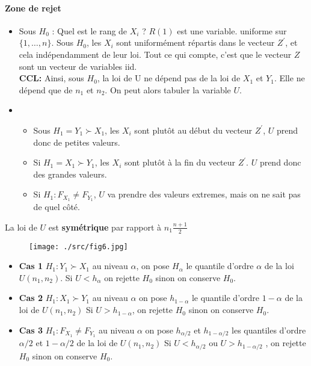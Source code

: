 \documentclass{article}
\theoremstyle{plain}%
\theoremstyle{definition}
\theoremstyle{remark}
\begin{document}
\paragraph*{Zone de rejet}
\begin{itemize}
    \item Sous $ H_0 $ : Quel est le rang de $ X_i $ ? $ R(1) $ est une variable. uniforme sur $ \{1,\dots,n\} $. Sous $ H_0 $, les $ X_i $ sont uniformément répartis dans le vecteur $ Z^\prime  $, et cela indépendamment de leur loi. Tout ce qui compte, c'est que le vecteur $ Z $ sont un vecteur de variables iid. \\
    \textbf{CCL:} Ainsi, sous $ H_0 $, la loi de U ne dépend pas de la loi de $ X_1 $ et $ Y_1 $. Elle ne dépend que de $ n_1 $ et $ n_2 $. On peut alors tabuler la variable $ U $.
    \item \begin{itemize}
        \item Sous $ H_1 = Y_1 \succ X_1$, les $ X_i $ sont plutôt au début du vecteur $ Z^\prime $, $ U $ prend donc de petites valeurs.
        \item Si $ H_1 = X_1 \succ Y_1 $, les $ X_i $ sont plutôt à la fin du vecteur $ Z^\prime  $. $ U $  prend donc des grandes valeurs.
        \item Si $ H_1 : F_{X_1} \neq F_{Y_1} $, $ U $ va prendre des valeurs extremes, mais on ne sait pas de quel côté.
    \end{itemize}
\end{itemize}

La loi de $ U $ est \textbf{symétrique} par rapport à $ n_1 \frac{n+1}{2} $ 
\begin{figure}[!h]
    \centering
    \texttt{[image: ./src/fig6.jpg]}
\end{figure}

\begin{itemize}
    \item \textbf{Cas 1} $ H_1: Y_1 \succ X_1 $ au niveau $ \alpha $, on pose $ H_\alpha  $ le quantile d'ordre $ \alpha $ de la loi $ U(n_1, n_2) $. Si $ U < h_\alpha  $ on rejette $ H_0 $ sinon on conserve $ H_0 $.
    \item \textbf{Cas 2} $ H_1 : X_1 \succ Y_1 $ au niveau $ \alpha  $ on pose $ h_{1 - \alpha } $ le quantile d'ordre $ 1 - \alpha  $ de la loi de $ U(n_1, n_2) $ Si $ U > h_{1 - \alpha } $, on rejette $ H_0 $ sinon on conserve $ H_0 $.
    \item \textbf{Cas 3} $ H_1 : F_{X_1} \neq F_{Y_1} $ au niveau $ \alpha $ on pose $ h_{\alpha /2} $ et  $ h_{1 - \alpha/2 } $ les quantiles d'ordre $ \alpha /2 $ et $ 1 - \alpha/2  $ de la loi de $ U(n_1, n_2) $ Si $ U < h_{\alpha /2} $ ou $ U > h_{1 - \alpha /2} $ , on rejette $ H_0 $ sinon on conserve $ H_0 $.
\end{itemize}
\end{document}
